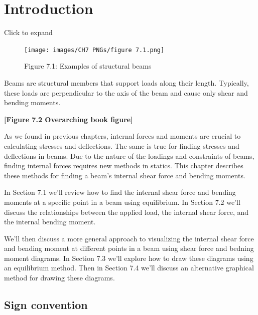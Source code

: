 \documentclass[
  letterpaper,
  DIV=11,
  numbers=noendperiod]{scrreprt}
\theoremstyle{definition}
\theoremstyle{remark}
\begin{document}
\section*{Introduction}\label{introduction-6}


Click to expand

\begin{figure}[H]

{\centering \texttt{[image: images/CH7 PNGs/figure 7.1.png]}

}

\caption{Figure 7.1: Examples of structural beams}

\end{figure}%

Beams are structural members that support loads along their length.
Typically, these loads are perpendicular to the axis of the beam and
cause only shear and bending moments.

\textbf{{[}Figure 7.2 Overarching book figure{]}}

As we found in previous chapters, internal forces and moments are
crucial to calculating stresses and deflections. The same is true for
finding stresses and deflections in beams. Due to the nature of the
loadings and constraints of beams, finding internal forces requires new
methods in statics. This chapter describes these methods for finding a
beam's internal shear force and bending moments.

In Section 7.1 we'll review how to find the internal shear force and
bending moments at a specific point in a beam using equilibrium. In
Section 7.2 we'll discuss the relationships between the applied load,
the internal shear force, and the internal bending moment.

We'll then discuss a more general approach to visualizing the internal
shear force and bending moment at different points in a beam using shear
force and bedning moment diagrams. In Section 7.3 we'll explore how to
draw these diagrams using an equilibrium method. Then in Section 7.4
we'll discuss an alternative graphical method for drawing these
diagrams.

\subsection*{Sign convention}\label{sign-convention}
\end{document}

